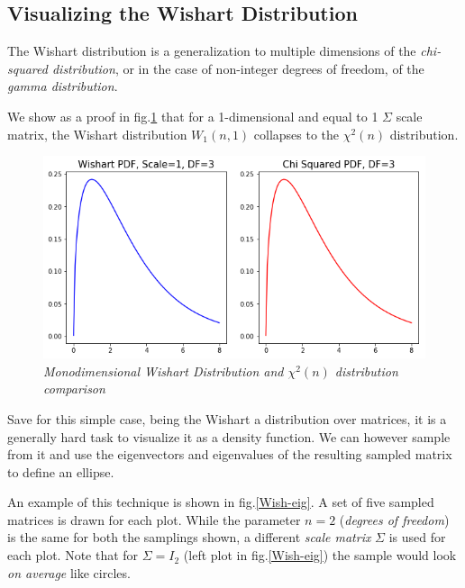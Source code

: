 \documentclass[12pt,openright,twoside,a4paper]{book}
\begin{document}
\subsection{Visualizing the Wishart Distribution}

The Wishart distribution is a generalization to multiple dimensions of the \textit{chi-squared distribution}, or in the case of non-integer degrees of freedom, of the \textit{gamma distribution}.

We show as a proof in fig.\ref{Wish-chi2} that for a 1-dimensional and equal to 1 $\Sigma$ scale matrix, the Wishart distribution $W_1(n,1)$ collapses to the $\chi^2(n)$ distribution.

\begin{figure}[!h]
\centering
\includegraphics[scale=0.37]{wish-chi}
\caption{\textit{Monodimensional Wishart Distribution and $\chi^2(n)$ distribution comparison}}
\label{Wish-chi2}
\end{figure}

Save for this simple case, being the Wishart a distribution over matrices, it is a generally hard task to visualize it as a density function.
We can however sample from it and use the eigenvectors and eigenvalues of the resulting sampled matrix to define an ellipse.

An example of this technique is shown in fig.\ref{Wish-eig}. A set of five sampled matrices is drawn for each plot. While the parameter $n=2$ (\textit{degrees of freedom}) is the same for both the samplings shown, a different \textit{scale matrix} $\Sigma$ is used for each plot.
Note that for $\Sigma=I_2$ (left plot in fig.\ref{Wish-eig}) the sample would look \textit{on average} like circles.
\end{document}
